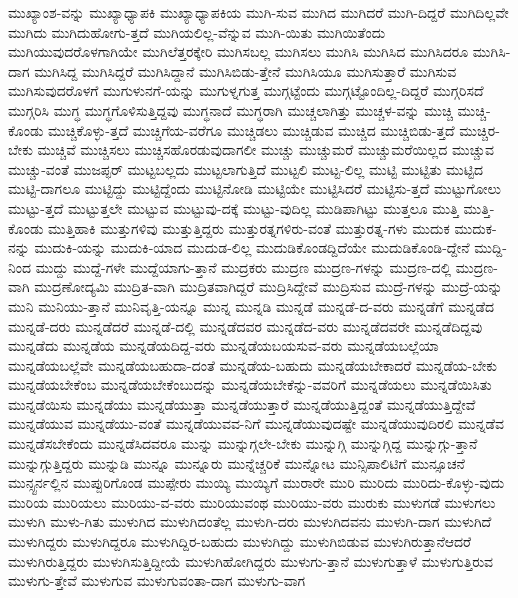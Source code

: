 {ಮುಖ್ಯಾಂಶ-ವನ್ನು
ಮುಖ್ಯಾಧ್ಯಾಪಕಿ
ಮುಖ್ಯಾಧ್ಯಾಪಕಿಯ
ಮುಗಿ-ಸುವ
ಮುಗಿದ
ಮುಗಿದರೆ
ಮುಗಿ-ದಿದ್ದರೆ
ಮುಗಿದಿಲ್ಲವೇ
ಮುಗಿದು
ಮುಗಿದುಹೋಗು-ತ್ತದೆ
ಮುಗಿಯಲಿಲ್ಲ-ವೆನ್ನುವ
ಮುಗಿ-ಯಿತು
ಮುಗಿಯಿತೆಂದು
ಮುಗಿಯುವುದರೊಳಗಾಗಿಯೇ
ಮುಗಿಲೆತ್ತರಕ್ಕೇರಿ
ಮುಗಿಸಬಲ್ಲ
ಮುಗಿಸಲು
ಮುಗಿಸಿ
ಮುಗಿಸಿದ
ಮುಗಿಸಿದರೂ
ಮುಗಿಸಿ-ದಾಗ
ಮುಗಿಸಿದ್ದ
ಮುಗಿಸಿದ್ದರೆ
ಮುಗಿಸಿದ್ದಾನೆ
ಮುಗಿಸಿಬಿಡು-ತ್ತೇನೆ
ಮುಗಿಸಿಯೂ
ಮುಗಿಸುತ್ತಾರೆ
ಮುಗಿಸುವ
ಮುಗಿಸುವುದರೊಳಗೆ
ಮುಗುಳುನಗೆ-ಯನ್ನು
ಮುಗುಳ್ನಗುತ್ತ
ಮುಗ್ಗಟ್ಟೆಂದು
ಮುಗ್ಗಟ್ಟೊಂದಿಲ್ಲ-ದಿದ್ದರೆ
ಮುಗ್ಗರಿಸದೆ
ಮುಗ್ಗರಿಸಿ
ಮುಗ್ಧ
ಮುಗ್ಧಗೊಳಿಸುತ್ತಿದ್ದವು
ಮುಗ್ಧನಾದೆ
ಮುಗ್ಧರಾಗಿ
ಮುಚ್ಚಲಾಗಿತ್ತು
ಮುಚ್ಚಳ-ವನ್ನು
ಮುಚ್ಚಿ
ಮುಚ್ಚಿ-ಕೊಂಡು
ಮುಚ್ಚಿಕೊಳ್ಳು-ತ್ತದೆ
ಮುಚ್ಚಿಗೆಯ-ವರೆಗೂ
ಮುಚ್ಚಿಡಲು
ಮುಚ್ಚಿಡುವ
ಮುಚ್ಚಿದ
ಮುಚ್ಚಿಬಿಡು-ತ್ತದೆ
ಮುಚ್ಚಿರ-ಬೇಕು
ಮುಚ್ಚಿವೆ
ಮುಚ್ಚಿಸಲು
ಮುಚ್ಚಿಸಹೊರಡುವುದಾಗಲೀ
ಮುಚ್ಚು
ಮುಚ್ಚುಮರೆ
ಮುಚ್ಚುಮರೆಯಿಲ್ಲದ
ಮುಚ್ಚುವ
ಮುಚ್ಚು-ವಂತೆ
ಮುಜಪ್ಫರ್
ಮುಟ್ಟಬಲ್ಲದು
ಮುಟ್ಟಲಾಗುತ್ತಿದೆ
ಮುಟ್ಟಲಿ
ಮುಟ್ಟ-ಲಿಲ್ಲ
ಮುಟ್ಟಿ
ಮುಟ್ಟಿತು
ಮುಟ್ಟಿದ
ಮುಟ್ಟಿ-ದಾಗಲೂ
ಮುಟ್ಟಿದ್ದು
ಮುಟ್ಟಿದ್ದೆಂದು
ಮುಟ್ಟಿನೋಡಿ
ಮುಟ್ಟಿಯೇ
ಮುಟ್ಟಿಸಿದರೆ
ಮುಟ್ಟಿಸು-ತ್ತದೆ
ಮುಟ್ಟುಗೋಲು
ಮುಟ್ಟು-ತ್ತದೆ
ಮುಟ್ಟುತ್ತಲೇ
ಮುಟ್ಟುವ
ಮುಟ್ಟುವು-ದಕ್ಕೆ
ಮುಟ್ಟು-ವುದಿಲ್ಲ
ಮುಡಿಪಾಗಿಟ್ಟು
ಮುತ್ತಲೂ
ಮುತ್ತಿ
ಮುತ್ತಿ-ಕೊಂಡು
ಮುತ್ತಿಹಾಕಿ
ಮುತ್ತುಗಳಿವು
ಮುತ್ತುತ್ತಿದ್ದರು
ಮುತ್ತುರತ್ನಗಳಿರು-ವಂತೆ
ಮುತ್ತುರತ್ನ-ಗಳು
ಮುದುಕ
ಮುದುಕ-ನನ್ನು
ಮುದುಕಿ-ಯನ್ನು
ಮುದುಕಿ-ಯಾದ
ಮುದುಡ-ಲಿಲ್ಲ
ಮುದುಡಿಕೊಂಡದ್ದಿದೆಯೇ
ಮುದುಡಿಕೊಂಡಿ-ದ್ದೇನೆ
ಮುದ್ದಿ-ನಿಂದ
ಮುದ್ದು
ಮುದ್ದೆ-ಗಳೇ
ಮುದ್ದೆಯಾಗು-ತ್ತಾನೆ
ಮುದ್ರಕರು
ಮುದ್ರಣ
ಮುದ್ರಣ-ಗಳನ್ನು
ಮುದ್ರಣ-ದಲ್ಲಿ
ಮುದ್ರಣ-ವಾಗಿ
ಮುದ್ರಣೋದ್ಯಮಿ
ಮುದ್ರಿತ-ವಾಗಿ
ಮುದ್ರಿತವಾಗಿದ್ದರೆ
ಮುದ್ರಿಸಿದ್ದೇವೆ
ಮುದ್ರಿಸುವ
ಮುದ್ರೆ-ಗಳನ್ನು
ಮುದ್ರೆ-ಯನ್ನು
ಮುನಿ
ಮುನಿಯು-ತ್ತಾನೆ
ಮುನಿವೃತ್ತಿ-ಯನ್ನೂ
ಮುನ್ನ
ಮುನ್ನಡಿ
ಮುನ್ನಡೆ
ಮುನ್ನಡೆ-ದ-ವರು
ಮುನ್ನಡೆಗೆ
ಮುನ್ನಡೆದ
ಮುನ್ನಡೆ-ದರು
ಮುನ್ನಡೆದರೆ
ಮುನ್ನಡೆ-ದಲ್ಲಿ
ಮುನ್ನಡೆದವರ
ಮುನ್ನಡೆದ-ವರು
ಮುನ್ನಡೆದವರೇ
ಮುನ್ನಡೆದಿದ್ದವು
ಮುನ್ನಡೆದು
ಮುನ್ನಡೆಯ
ಮುನ್ನಡೆಯದಿದ್ದ-ವರು
ಮುನ್ನಡೆಯಬಯಸುವ-ವರು
ಮುನ್ನಡೆಯಬಲ್ಲೆಯಾ
ಮುನ್ನಡೆಯಬಲ್ಲೆವೇ
ಮುನ್ನಡೆಯಬಹುದಾ-ದಂತೆ
ಮುನ್ನಡೆಯ-ಬಹುದು
ಮುನ್ನಡೆಯಬೇಕಾದರೆ
ಮುನ್ನಡೆಯ-ಬೇಕು
ಮುನ್ನಡೆಯಬೇಕೆಂಬ
ಮುನ್ನಡೆಯಬೇಕೆಂಬುದನ್ನು
ಮುನ್ನಡೆಯಬೇಕೆನ್ನು-ವವರಿಗೆ
ಮುನ್ನಡೆಯಲು
ಮುನ್ನಡೆಯಿಸಿತು
ಮುನ್ನಡೆಯಿಸು
ಮುನ್ನಡೆಯು
ಮುನ್ನಡೆಯುತ್ತಾ
ಮುನ್ನಡೆಯುತ್ತಾರೆ
ಮುನ್ನಡೆಯುತ್ತಿದ್ದಂತೆ
ಮುನ್ನಡೆಯುತ್ತಿದ್ದೇವೆ
ಮುನ್ನಡೆಯುವ
ಮುನ್ನಡೆಯು-ವಂತೆ
ಮುನ್ನಡೆಯುವವ-ನಿಗೆ
ಮುನ್ನಡೆಯುವುದಷ್ಟೇ
ಮುನ್ನಡೆಯುವುದಿರಲಿ
ಮುನ್ನಡೆವ
ಮುನ್ನಡೆಸಬೇಕೆಂದು
ಮುನ್ನಡೆಸಿದವರೂ
ಮುನ್ನು
ಮುನ್ನುಗ್ಗಲೇ-ಬೇಕು
ಮುನ್ನುಗ್ಗಿ
ಮುನ್ನುಗ್ಗಿದ್ದ
ಮುನ್ನುಗ್ಗು-ತ್ತಾನೆ
ಮುನ್ನುಗ್ಗುತ್ತಿದ್ದರು
ಮುನ್ನುಡಿ
ಮುನ್ನೂ
ಮುನ್ನೂರು
ಮುನ್ನೆಚ್ಚರಿಕೆ
ಮುನ್ನೋಟ
ಮುನ್ಸಿಪಾಲಿಟಿಗೆ
ಮುನ್ಸೂಚನೆ
ಮುನ್ಸ್ಟರ್ನಲ್ಲಿನ
ಮುಪ್ಪುರಿಗೊಂಡ
ಮುಪ್ಪೇರು
ಮುಯ್ಯಿ
ಮುಯ್ಯಿಗೆ
ಮುರಾರೇ
ಮುರಿ
ಮುರಿದು
ಮುರಿದು-ಕೊಳ್ಳು-ವುದು
ಮುರಿಯ
ಮುರಿಯಲು
ಮುರಿಯು-ವ-ವರು
ಮುರಿಯುವಂಥ
ಮುರಿಯು-ವರು
ಮುರುಕು
ಮುಳುಗಡೆ
ಮುಳುಗಲು
ಮುಳುಗಿ
ಮುಳು-ಗಿತು
ಮುಳುಗಿದ
ಮುಳುಗಿದಂತೆಲ್ಲ
ಮುಳುಗಿ-ದರು
ಮುಳುಗಿದವನು
ಮುಳುಗಿ-ದಾಗ
ಮುಳುಗಿದೆ
ಮುಳುಗಿದ್ದರು
ಮುಳುಗಿದ್ದರೂ
ಮುಳುಗಿದ್ದಿರ-ಬಹುದು
ಮುಳುಗಿದ್ದು
ಮುಳುಗಿಬಿಡುವ
ಮುಳುಗಿರುತ್ತಾನೆಆದರೆ
ಮುಳುಗಿರುತ್ತಿದ್ದರು
ಮುಳುಗಿಸುತ್ತಿದ್ದೀಯೆ
ಮುಳುಗಿಹೋಗಿದ್ದರು
ಮುಳುಗು-ತ್ತಾನೆ
ಮುಳುಗುತ್ತಾಳೆ
ಮುಳುಗುತ್ತಿರುವ
ಮುಳುಗು-ತ್ತೇವೆ
ಮುಳುಗುವ
ಮುಳುಗುವಂತಾ-ದಾಗ
ಮುಳುಗು-ವಾಗ
}
